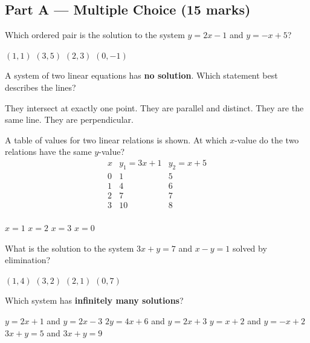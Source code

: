 \documentclass[addpoints]{exam}
\begin{document}
\newpage
\begin{questions}

\section*{Part A --- Multiple Choice (15 marks)}
\vspace{5mm}

\question[1] Which ordered pair is the solution to the system $y = 2x - 1$ and $y = -x + 5$?
\begin{choices}
    \choice $(1, 1)$
    \choice $(3, 5)$
    \correctchoice $(2, 3)$
    \choice $(0, -1)$
\end{choices}
\vspace{3mm}

\question[1] A system of two linear equations has \textbf{no solution}. Which statement best describes the lines?
\begin{choices}
    \choice They intersect at exactly one point.
    \correctchoice They are parallel and distinct.
    \choice They are the same line.
    \choice They are perpendicular.
\end{choices}
\vspace{3mm}

\question[1] A table of values for two linear relations is shown. At which $x$-value do the two relations have the same $y$-value?
\[
\begin{array}{c|c|c}
x & y_1 = 3x + 1 & y_2 = x + 5 \\ \hline
0 & 1 & 5 \\
1 & 4 & 6 \\
2 & 7 & 7 \\
3 & 10 & 8 \\
\end{array}
\]
\begin{choices}
    \choice $x = 1$
    \correctchoice $x = 2$
    \choice $x = 3$
    \choice $x = 0$
\end{choices}
\vspace{3mm}

\question[1] What is the solution to the system $3x + y = 7$ and $x - y = 1$ solved by elimination?
\begin{choices}
    \choice $(1, 4)$
    \choice $(3, 2)$
    \correctchoice $(2, 1)$
    \choice $(0, 7)$
\end{choices}
\vspace{3mm}

\question[1] Which system has \textbf{infinitely many solutions}?
\begin{choices}
    \choice $y = 2x + 1$ and $y = 2x - 3$
    \correctchoice $2y = 4x + 6$ and $y = 2x + 3$
    \choice $y = x + 2$ and $y = -x + 2$
    \choice $3x + y = 5$ and $3x + y = 9$
\end{choices}
\vspace{3mm}


\end{questions}
\end{document}
